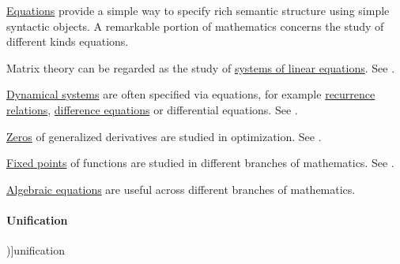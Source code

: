 \begin{example}\label{ex:def:equation}
  \hyperref[def:equation]{Equations} provide a simple way to specify rich semantic structure using simple syntactic objects. A remarkable portion of mathematics concerns the study of different kinds equations.

  \begin{thmenum}
     Matrix theory can be regarded as the study of \hyperref[def:system_of_linear_equations]{systems of linear equations}. See .

     \hyperref[def:dynamical_system]{Dynamical systems} are often specified via equations, for example \hyperref[def:recurrence_relation]{recurrence relations}, \hyperref[def:difference_equation]{difference equations} or differential equations. See .

     \hyperref[def:zero_of_function]{Zeros} of generalized derivatives are studied in optimization. See .

     \hyperref[def:function_fixed_point]{Fixed points} of functions are studied in different branches of mathematics. See .

     \hyperref[def:algebraic_equation]{Algebraic equations} are useful across different branches of mathematics.
  \end{thmenum}
\end{example}

\paragraph{Unification}

\begin{concept}\label{con:unification}
  \term[en=unification, ru=унификация (\cite[152]{Герасимов2011Вычислимость})]{unification}
  \todo{}
\end{concept}
